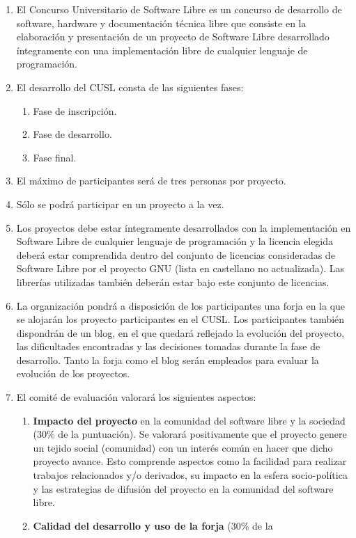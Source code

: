 \begin{enumerate}
\item El Concurso Universitario de Software Libre es un concurso de desarrollo
de software, hardware y documentación técnica libre que consiste en la
elaboración y presentación de un proyecto de Software Libre desarrollado
íntegramente con una implementación libre de cualquier lenguaje de programación.
\item El desarrollo del CUSL consta de las siguientes fases:
    \begin{enumerate}
    \item Fase de inscripción.
    \item Fase de desarrollo.
    \item Fase final.
    \end{enumerate}
\item El máximo de participantes será de tres personas por proyecto.
\item Sólo se podrá participar en un proyecto a la vez.
\item Los proyectos debe estar íntegramente desarrollados con la implementación
en Software Libre de cualquier lenguaje de programación y la licencia elegida
deberá estar comprendida dentro del conjunto de licencias consideradas de
Software Libre por el proyecto GNU (lista en castellano no actualizada). Las
librerías utilizadas también deberán estar bajo este conjunto de licencias.
\item La organización pondrá a disposición de los participantes una forja en la
que se alojarán los proyecto participantes en el CUSL. Los participantes también
dispondrán de un blog, en el que quedará reflejado la evolución del proyecto,
las dificultades encontradas y las decisiones tomadas durante la fase de
desarrollo. Tanto la forja como el blog serán empleados para evaluar la
evolución de los proyectos.
\item El comité de evaluación valorará los siguientes aspectos:
    \begin{enumerate}
    \item {\bf Impacto del proyecto} en la comunidad del software libre y la
    sociedad (30\% de la puntuación). Se valorará positivamente que el proyecto
    genere un tejido social (comunidad) con un interés común en hacer que dicho
    proyecto avance. Esto comprende aspectos como la facilidad para realizar
    trabajos relacionados y/o derivados, su impacto en la esfera socio-política
    y las estrategias de difusión del proyecto en la comunidad del software
    libre.
    \item {\bf Calidad del desarrollo y uso de la forja} (30\% de la

\end{enumerate}
\end{enumerate}
